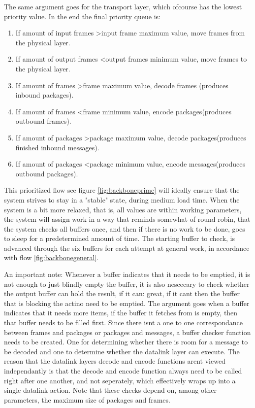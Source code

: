 The same argument goes for the transport layer, which ofcourse has the lowest priority value.
 In the end the final priority queue is:

\begin{enumerate}
\item If amount of input frames \textgreater input frame maximum value, move frames from the physical layer.
\item If amount of output frames \textless output frames minimum value, move frames to the physical layer.
\item If amount of frames \textgreater frame maximum value, decode frames (produces inbound packages).
\item If amount of frames \textless frame minimum value, encode packages(produces outbound frames).
\item If amount of packages \textgreater package maximum value, decode packages(produces finished inbound messages).
\item If amount of packages \textless package minimum value, encode messages(produces outbound packages).
\end{enumerate}
This prioritized flow see figure \ref{fig:backboneprime} will ideally ensure that the system strives to stay in a "stable" state, during medium load time.
When the system is a bit more relaxed, that is, all values are within working parameters, the system will assign work in a way that reminds somewhat of round robin, that the system checks all buffers once, and then if there is no work to be done, goes to sleep for a predetermined amount of time. The starting buffer to check, is advanced through the six buffers for each attempt at general work, in accordance with flow \ref{fig:backbonegeneral}.




An important note:
Whenever a buffer indicates that it needs to be emptied, it is not enough to just blindly empty the buffer, it is also nescecary to check whether the output buffer can hold the result, if it can: great, if it cant then the buffer that is blocking the actino need to be emptied.
The argument goes when a buffer indicates that it needs more items, if the buffer it fetches from is empty, then that buffer needs to be filled first.
Since there isnt a one to one correspondance between frames and packages or packages and messages, a buffer checker function needs to be created. One for determining whether there is room for a message to be decoded and one to determine whether the datalink layer can execute. The reason that the datalink layers decode and encode functions arent viewed independantly is that the decode and encode function always need to be called right after one another, and not seperately, which effectively wraps up into a single datalink action.
Note that these checks depend on, among other parameters, the maximum size of packages and frames.





